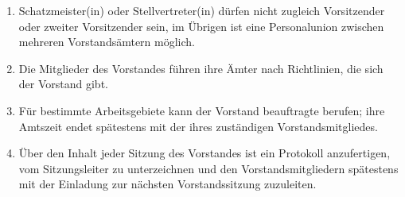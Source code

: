 \documentclass[%
12pt, %
a4paper, %
headsepline, %
footsepline, %
parskip, %
headings=normal, %
]{scrartcl}
\begin{document}
\begin{enumerate}
    \item Schatzmeister(in) oder Stellvertreter(in) dürfen nicht zugleich Vorsitzender oder zweiter Vorsitzender sein, im Übrigen ist eine Personalunion zwischen mehreren Vorstandsämtern möglich.
    \item Die Mitglieder des Vorstandes führen ihre Ämter nach Richtlinien, die sich der Vorstand gibt.
    \item Für bestimmte Arbeitsgebiete kann der Vorstand beauftragte berufen; ihre Amtszeit endet spätestens mit der ihres zuständigen Vorstandsmitgliedes.
    \item Über den Inhalt jeder Sitzung des Vorstandes ist ein Protokoll anzufertigen, vom Sitzungsleiter zu unterzeichnen und den Vorstandsmitgliedern spätestens mit der Einladung zur nächsten Vorstandssitzung zuzuleiten.

\end{enumerate}
\end{document}
